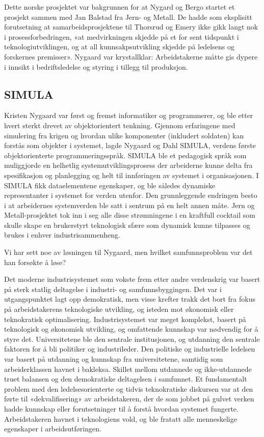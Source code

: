 \documentclass[../main.tex]{subfiles}
\begin{document}
Dette norske prosjektet var bakgrunnen for at Nygard og Bergo startet et prosjekt sammen med Jan Balstad fra Jern- og Metall. De hadde som eksplisitt forutsetning at samarbeidsprosjektene til Thorsrud og Emery ikke gikk langt nok i prosessforbedringen, «at medvirkningen skjedde på et for sent tidspunkt i teknologiutviklingen, og at all kunnsakpsutvikling skjedde på ledelsens og forskernes premisser». Nygaard var krystallklar: Arbeidstakerne måtte gis dypere i innsikt i bedriftsledelse og styring i tillegg til produksjon.

\subsection{SIMULA}
Kristen Nygaard var først og fremst informatiker og programmerer, og ble etter hvert sterkt drevet av objektorientert tenkning. Gjennom erfaringene med simulering fra krigen og hvordan ulike komponenter (inkludert soldaten) kan forstås som objekter i systemet, lagde Nygaard og Dahl SIMULA, verdens første objektorienterte programmeringsspråk. SIMULA ble et pedagogisk språk som muliggjorde en helhetlig systemutviklingsprosess der arbeiderne kunne delta fra spesifikasjon og planlegging og helt til innføringen av systemet i organisasjonen. I SIMULA fikk dataelementene egenskaper, og ble således dynamiske representanter i systemet for verden utenfor. Den grunnleggende endringen besto i at arbeidernes systemverden ble satt i sentrum på en helt annen måte. Jern og Metall-prosjektet tok inn i seg alle disse strømningene i en kraftfull cocktail som skulle skape en brukerstyrt teknologisk sfære som dynamisk kunne tilpasses og brukes i enhver industrisammenheng. 

Vi har sett noe av løsningen til Nygaard, men hvilket samfunnsproblem var det han forsøkte å løse? 


Det moderne industrisystemet som vokste frem etter andre verdenskrig var basert på sterk statlig deltagelse i industri- og samfunnsbyggingen. Det var i utgangspunktet lagt opp demokratisk, men visse krefter trakk det bort fra fokus på arbeidstakerens teknologiske utvikling, og isteden mot økonomisk eller teknokratisk optimalisering. Industrisystemet var meget komplekst, basert på teknologisk og økonomisk utvikling, og omfattende kunnskap var nødvendig for å styre det. Universitetene ble den sentrale institusjonen, og utdanning den sentrale faktoren for å bli politiker og industrileder. Den politiske og industrielle ledelsen var basert på utdanning og kunnskap fra universitetene, samtidig som arbeiderklassen havnet i bakleksa. Skillet mellom utdannede og ikke-utdannede truet balansen og den demokratiske deltagelsen i samfunnet. Et fundamentalt problem med den ledelsesorienterte og tidvis teknokratiske diskursen var at den førte til «dekvalifisering» av arbeidstakeren, der de som jobbet på gulvet verken hadde kunnskap eller forutsetninger til å forstå hvordan systemet fungerte. Arbeidstakeren havnet i teknologiens vold, og ble fratatt alle menneskelige egenskaper i arbeidsutføringen.
\end{document}
